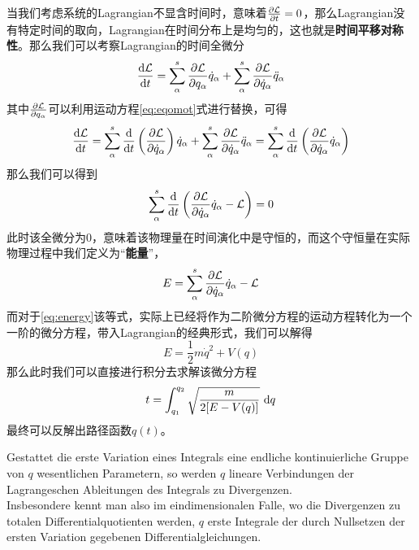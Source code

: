 当我们考虑系统的Lagrangian不显含时间时，意味着$ \frac{\partial\mathcal{L}}{\partial t }=0$，那么Lagrangian没有特定时间的取向，Lagrangian在时间分布上是均匀的，这也就是\textbf{时间平移对称性}。那么我们可以考察Lagrangian的时间全微分
\begin{equation}
    \frac{\mathrm{d} \mathcal{L} }{\mathrm{d} t} = \sum_\alpha^s \frac{\partial\mathcal{L}}{\partial q_\alpha}\dot q_\alpha + \sum_\alpha^s \frac{\partial\mathcal{L}}{\partial \dot q_\alpha}\ddot q_\alpha
\end{equation}
其中$\frac{\partial\mathcal{L}}{\partial q_\alpha}$可以利用运动方程\eqref{eq:eqomot}式进行替换，可得
\begin{equation}
    \frac{\mathrm{d} \mathcal{L} }{\mathrm{d} t} = \sum_\alpha^s \frac{\mathrm{d} }{\mathrm{d} t}\left(\frac{\partial\mathcal{L}}{\partial \dot q_\alpha} \right) \dot q_\alpha + \sum_\alpha^s \frac{\partial\mathcal{L}}{\partial \dot q_\alpha}\ddot q_\alpha = \sum_\alpha^s \frac{\mathrm{d} }{\mathrm{d} t}\left(\frac{\partial\mathcal{L}}{\partial \dot q_\alpha}\dot q_\alpha \right)
\end{equation}
那么我们可以得到
\begin{equation}
     \sum_\alpha^s \frac{\mathrm{d} }{\mathrm{d} t}\left(\frac{\partial\mathcal{L}}{\partial \dot q_\alpha}\dot q_\alpha -\mathcal{L}\right) = 0
\end{equation}
此时该全微分为0，意味着该物理量在时间演化中是守恒的，而这个守恒量在实际物理过程中我们定义为“\textbf{能量}”，
\begin{equation}
    E =  \sum_\alpha^s \frac{\partial\mathcal{L}}{\partial \dot q_\alpha}\dot q_\alpha -\mathcal{L}\label{eq:energy}
\end{equation}
而对于\eqref{eq:energy}该等式，实际上已经将作为二阶微分方程的运动方程转化为一个一阶的微分方程，带入Lagrangian的经典形式，我们可以解得
\begin{equation}
    E = \frac{1}{2}m \dot q^2 + V(q)
\end{equation}
那么此时我们可以直接进行积分去求解该微分方程
\begin{equation}
    t = \int_{q_1}^{q_2} \sqrt{\frac{m}{2[E-V(q)]}}~\mathrm{d} q
\end{equation}
最终可以反解出路径函数$q(t)$。


\begin{theorem}
    Gestattet die erste Variation eines Integrals eine endliche kontinuierliche Gruppe von \(q\) wesentlichen Parametern, so werden \(q\) lineare Verbindungen der Lagrangeschen Ableitungen des Integrals zu Divergenzen.\\ Insbesondere kennt man also im eindimensionalen Falle, wo die Divergenzen zu totalen Differentialquotienten werden, \(q\) erste Integrale der durch Nullsetzen der ersten Variation gegebenen Differentialgleichungen.
\end{theorem}

